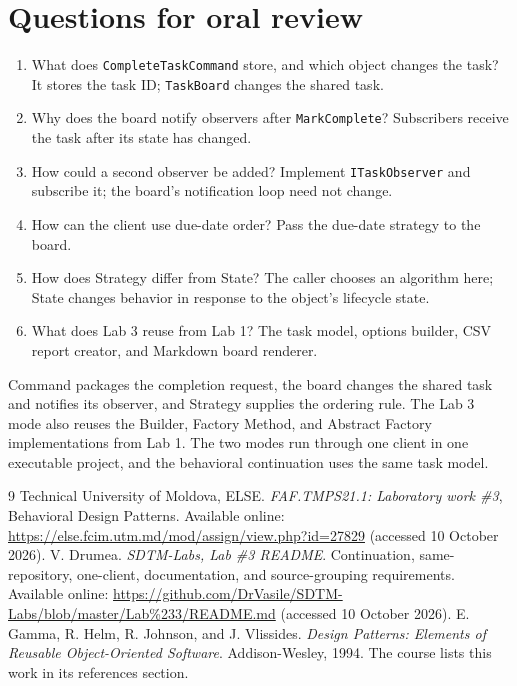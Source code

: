\documentclass{utmreport}
\begin{document}
\section{Questions for oral review}
\begin{enumerate}
\item What does \texttt{CompleteTaskCommand} store, and which object changes the task? It stores the task ID; \texttt{TaskBoard} changes the shared task.
\item Why does the board notify observers after \texttt{MarkComplete}? Subscribers receive the task after its state has changed.
\item How could a second observer be added? Implement \texttt{ITaskObserver} and subscribe it; the board's notification loop need not change.
\item How can the client use due-date order? Pass the due-date strategy to the board.
\item How does Strategy differ from State? The caller chooses an algorithm here; State changes behavior in response to the object's lifecycle state.
\item What does Lab 3 reuse from Lab 1? The task model, options builder, CSV report creator, and Markdown board renderer.
\end{enumerate}

\utmconclusions
Command packages the completion request, the board changes the shared task and notifies its observer, and Strategy supplies the ordering rule. The Lab 3 mode also reuses the Builder, Factory Method, and Abstract Factory implementations from Lab 1. The two modes run through one client in one executable project, and the behavioral continuation uses the same task model.

\begin{thebibliography}{9}
 Technical University of Moldova, ELSE. \textit{FAF.TMPS21.1: Laboratory work \#3}, Behavioral Design Patterns. Available online: \url{https://else.fcim.utm.md/mod/assign/view.php?id=27829} (accessed 10 October 2026).
 V. Drumea. \textit{SDTM-Labs, Lab \#3 README}. Continuation, same-repository, one-client, documentation, and source-grouping requirements. Available online: \url{https://github.com/DrVasile/SDTM-Labs/blob/master/Lab%233/README.md} (accessed 10 October 2026).
 E. Gamma, R. Helm, R. Johnson, and J. Vlissides. \textit{Design Patterns: Elements of Reusable Object-Oriented Software}. Addison-Wesley, 1994. The course lists this work in its references section.
\end{thebibliography}
\end{document}
